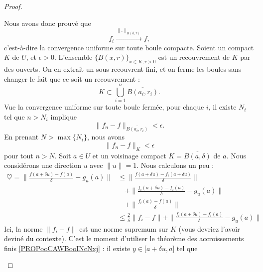 \begin{proof}
\begin{subproof}
		Nous avons donc prouvé que
		\begin{equation}
			f_i\stackrel{\| . \|_{\overline{ B(a,r) }}}{\longrightarrow}f,
		\end{equation}
		c'est-à-dire la convergence uniforme sur toute boule compacte.
		Soient un compact \( K\) de \( U\), et \( \epsilon>0\). L'ensemble \( \{ B(x,r) \}_{x\in K, r>0}\) est un recouvrement de \( K\) par des ouverts. On en extrait un sous-recouvrent fini, et on ferme les boules sans changer le fait que ce soit un recouvrement :
		\begin{equation}
			K\subset \bigcup_{i=1}^n\overline{ B(a_i, r_i) }.
		\end{equation}
		Vue la convergence uniforme sur toute boule fermée, pour chaque \( i\), il existe \( N_i\) tel que \( n>N_i\) implique
		\begin{equation}
			\| f_n-f \|_{\overline{ B(a_i,r_i) }}<\epsilon.
		\end{equation}
		En prenant \( N>\max\{ N_i \}\), nous avons
		\begin{equation}
			\| f_n-f \|_K<\epsilon
		\end{equation}
		pour tout \( n>N\).
		Soit \( a\in U\) et un voisinage compact \( K=\overline{ B(a,\delta) }\) de \( a\). Nous considérons une direction \( u\) avec \( \| u \|=1\). Nous calculons un peu :
		\begin{subequations}
			\begin{align}
				\heartsuit=\| \frac{ f(a+\delta u)-f(a) }{ \delta }-g_u(a) \| & \leq \| \frac{ f(a+\delta u)-f_i(a+\delta u) }{ \delta } \|                                 \\
				                                                              & \quad +\|  \frac{ f_i(a+\delta u)-f_i(a) }{ \delta }-g_u(a) \|      \nonumber               \\
				                                                              & \quad +\| \frac{ f_i(a)-f(a) }{ \delta } \|        \nonumber                                \\
				                                                              & \leq \frac{ 2 }{ \delta }\| f_i-f \|+\| \frac{ f_i(a+\delta u)-f_i(a) }{ \delta }-g_u(a) \|
			\end{align}
		\end{subequations}
		Ici, la norme \( \| f_i-f \|\) est une norme supremum sur \( K\) (vous devriez l'avoir deviné du contexte). C'est le moment d'utiliser le théorème des accroissements finis \ref{PROPooCAWBooINcNxj} : il existe \( y\in \mathopen[ a+\delta u , a \mathclose]\) tel que

\end{subproof}
\end{proof}
